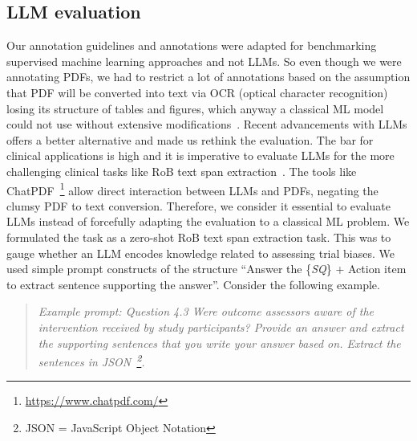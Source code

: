 \documentclass[sn-mathphys,Numbered]{sn-jnl}%
\theoremstyle{thmstyleone}%
\theoremstyle{thmstyletwo}%
\theoremstyle{thmstylethree}%
\begin{document}
\subsection{LLM evaluation}
\label{method:llm}
%
Our annotation guidelines and annotations were adapted for benchmarking supervised machine learning approaches and not LLMs.
So even though we were annotating PDFs, we had to restrict a lot of annotations based on the assumption that PDF will be converted into text via OCR (optical character recognition) losing its structure of tables and figures, which anyway a classical ML model could not use without extensive modifications~\cite{li2019figure,li2023uttsr}.
Recent advancements with LLMs offers a better alternative and made us rethink the evaluation.
The bar for clinical applications is high and it is imperative to evaluate LLMs for the more challenging clinical tasks like RoB text span extraction~\cite{singhal2023large}.
The tools like ChatPDF~\footnote{\url{https://www.chatpdf.com/}} allow direct interaction between LLMs and PDFs, negating the clumsy PDF to text conversion.
Therefore, we consider it essential to evaluate LLMs instead of forcefully adapting the evaluation to a classical ML problem.
We formulated the task as a zero-shot RoB text span extraction task.
This was to gauge whether an LLM encodes knowledge related to assessing trial biases.
We used simple prompt constructs of the structure ``Answer the \{\textit{SQ}\} + Action item to extract sentence supporting the answer''.
Consider the following example.

\begin{quote}
\itshape Example prompt: Question 4.3 Were outcome assessors aware of the intervention received by study participants? Provide an answer and extract the supporting sentences that you write your answer based on. Extract the sentences in JSON~\footnote{JSON = JavaScript Object Notation}.
\end{quote}
\end{document}
